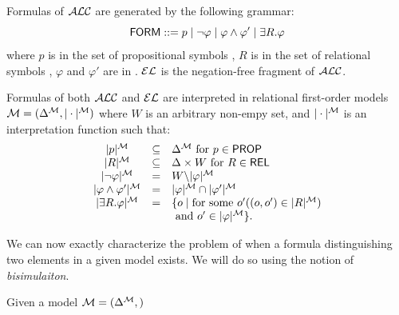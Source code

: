 \begin{definition}
Formulas of $\mathcal{ALC}$ are generated by the following grammar:
$$
\textsf{FORM} ::= p \mid \neg \varphi \mid \varphi \wedge \varphi' \mid \exists R. \varphi
$$
where $p$ is in the set of propositional symbols \prop, $R$ is in the set of relational symbols \rel, $\varphi$ and $\varphi'$ are in \form. $\mathcal{EL}$ is the
negation-free fragment of $\mathcal{ALC}$.

Formulas of both $\mathcal{ALC}$ and $\mathcal{EL}$ are interpreted in relational first-order models
$\mathcal{M} = (\Delta^{\mathcal{M}},|\cdot|^{\mathcal{M}})$ where $W$ is an arbitrary non-empy set, and $|\cdot|^{\mathcal{M}}$ is an interpretation
function such that:
$$
\begin{array}{ccl}
|p|^{\mathcal{M}} & \subseteq & \Delta^{\mathcal{M}}  \mbox{ for $p \in \textsf{PROP}$}\\
|R|^{\mathcal{M}} & \subseteq & \Delta\times W  \mbox{ for $R \in \textsf{REL}$}\\
|\neg \varphi|^{\mathcal{M}} & = & W \backslash |\varphi|^{\mathcal{M}}\\
|\varphi \wedge \varphi'|^{\mathcal{M}} & = & |\varphi|^{\mathcal{M}} \cap |\varphi'|^{\mathcal{M}}\\
|\exists R.\varphi|^{\mathcal{M}} & = & \{o \mid \mbox{for some } o' ((o,o') \in |R|^{\mathcal{M}})\\
& & \mbox{ and } o' \in |\varphi|^{\mathcal{M}} \}.\\
\end{array}
$$
\end{definition}

We can now exactly characterize the problem of when a formula distinguishing two
elements in a given model exists. We will do so using the notion of \emph{bisimulaiton}.

\begin{definition}
Given a model $\mathcal{M} = (\Delta^{\mathcal{M}},)$
\end{definition}


\cite{dovier04:_effic_algor_for_comput_bisim_equiv}

